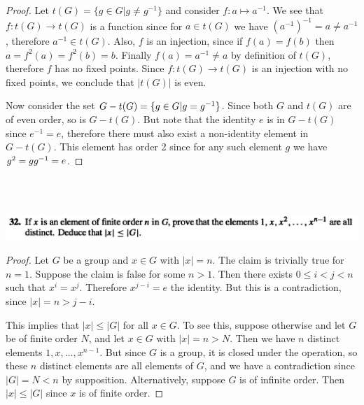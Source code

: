 \begin{proof}
  Let $t(G) = \{g \in G | g \neq g^{-1}\}$ and consider $f: a \mapsto a^{-1}$. We see
  that $f: t(G) \to t(G)$ is a function since for $a \in t(G)$ we have
  $(a^{-1})^{-1} = a \neq a^{-1}$, therefore $a^{-1} \in t(G)$. Also, $f$ is an injection, since
  if $f(a) = f(b)$ then $a = f^2(a) = f^2(b) = b$. Finally $f(a) = a^{-1} \neq a$ by definition
  of $t(G)$, therefore $f$ has no fixed points. Since $f: t(G) \to t(G)$ is an injection with no
  fixed points, we conclude that $|t(G)|$ is even.

  Now consider the set $G - t(G) = \{g \in G | g = g^{-1}\}$. Since both $G$ and $t(G)$ are of even
  order, so is $G - t(G)$. But note that the identity $e$ is in $G - t(G)$ since $e^{-1} = e$,
  therefore there must also exist a non-identity element in $G - t(G)$. This element has order 2
  since for any such element $g$ we have $g^2 = gg^{-1} = e$.
\end{proof}




~\\~\\
\begin{mdframed}
\includegraphics[width=400pt]{img/algebra--nf--1--problem-set-1-a008.png}
\end{mdframed}

\begin{proof}
  Let $G$ be a group and $x \in G$ with $|x| = n$. The claim is trivially true for $n = 1$. Suppose
  the claim is false for some $n > 1$. Then there exists $0 \leq i < j < n$ such that $x^i = x^j$.
  Therefore $x^{j - i} = e$ the identity. But this is a contradiction, since $|x| = n > j - i$.

  This implies that $|x| \leq |G|$ for all $x \in G$. To see this, suppose otherwise and let $G$ be of
  finite order $N$, and let $x \in G$ with $|x| = n > N$. Then we have $n$ distinct
  elements $1, x, \ldots, x^{n-1}$. But since $G$ is a group, it is closed under the operation, so
  these $n$ distinct elements are all elements of $G$, and we have a contradiction
  since $|G| = N < n$ by supposition. Alternatively, suppose $G$ is of infinite order.
  Then $|x| \leq |G|$ since $x$ is of finite order.
\end{proof}




